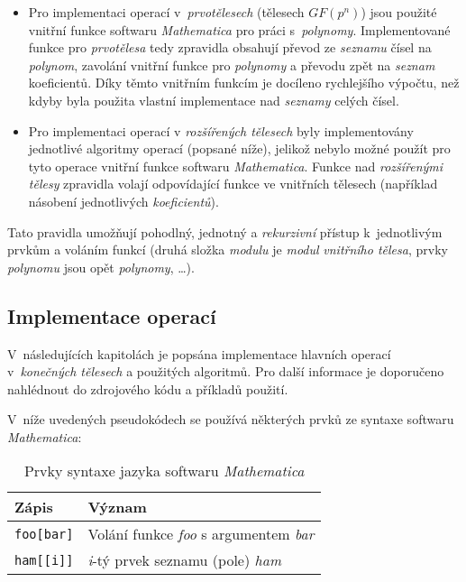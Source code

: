 \documentclass[thesis=M,czech,hidelinks]{FITthesis}[2012/06/26]
\begin{document}
\begin{itemize}
    \item Pro implementaci operací v~\emph{prvotělesech} (tělesech $GF(p^n)$)
        jsou použité vnitřní funkce softwaru \emph{Mathematica} pro práci
        s~\emph{polynomy}. Implementované funkce pro \emph{prvotělesa} tedy
        zpravidla obsahují převod ze \emph{seznamu} čísel na \emph{polynom},
        zavolání vnitřní funkce pro \emph{polynomy} a převodu zpět na
        \emph{seznam} koeficientů. Díky těmto vnitřním funkcím je docíleno
        rychlejšího výpočtu, než kdyby byla použita vlastní implementace nad
        \emph{seznamy} celých čísel.

    \item Pro implementaci operací v \emph{rozšířených tělesech} byly
        implementovány jednotlivé algoritmy operací (popsané níže), jelikož
        nebylo možné použít pro tyto operace vnitřní funkce softwaru
        \emph{Mathematica}. Funkce nad \emph{rozšířenými tělesy} zpravidla
        volají odpovídající funkce ve vnitřních tělesech (například násobení
        jednotlivých \emph{koeficientů}).

\end{itemize}

Tato pravidla umožňují pohodlný, jednotný a \emph{rekurzivní} přístup
k~jednotlivým prvkům a voláním funkcí (druhá složka \emph{modulu} je
\emph{modul} \emph{vnitřního tělesa}, prvky \emph{polynomu} jsou opět
\emph{polynomy}, \ldots).

\subsection{Implementace operací}
V~následujících kapitolách je popsána implementace hlavních operací
v~\emph{konečných tělesech} a použitých algoritmů. Pro další informace je
doporučeno nahlédnout do zdrojového kódu a příkladů použití.

V~níže uvedených pseudokódech se používá některých prvků ze syntaxe softwaru
\emph{Mathematica}:

\begin{table}[h!]
    \centering
    \begin{tabular}{ l  l }
        Zápis               & Význam                                            \\
        \hline
        \texttt{foo[bar]}   & Volání funkce \emph{foo} s argumentem \emph{bar}  \\
        \texttt{ham[[i]]}   & \emph{i}-tý prvek seznamu (pole) \emph{ham}       \\
    \end{tabular}
    \caption{Prvky syntaxe jazyka softwaru \emph{Mathematica}}
\end{table}
\end{document}
